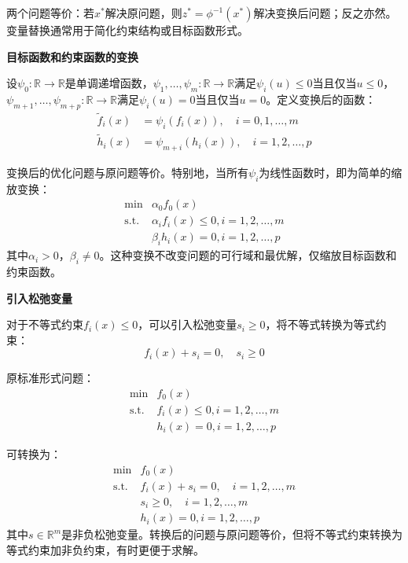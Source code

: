 \documentclass[12pt,a4paper]{book}
\begin{document}
两个问题等价：若$x^*$解决原问题，则$z^* = \phi^{-1}(x^*)$解决变换后问题；反之亦然。变量替换通常用于简化约束结构或目标函数形式。

\textbf{目标函数和约束函数的变换}

设$\psi_0: \mathbb{R} \to \mathbb{R}$是单调递增函数，$\psi_1,\dots,\psi_m: \mathbb{R} \to \mathbb{R}$满足$\psi_i(u) \leq 0$当且仅当$u \leq 0$，$\psi_{m+1},\dots,\psi_{m+p}: \mathbb{R} \to \mathbb{R}$满足$\psi_i(u) = 0$当且仅当$u = 0$。定义变换后的函数：
\begin{align*}
    \tilde{f}_i(x) &= \psi_i(f_i(x)), \quad i = 0,1,\dots,m \\
    \tilde{h}_i(x) &= \psi_{m+i}(h_i(x)), \quad i = 1,2,\dots,p
\end{align*}

变换后的优化问题与原问题等价。特别地，当所有$\psi_i$为线性函数时，即为简单的缩放变换：
\begin{equation}
    \begin{aligned}
        \min & \alpha_0 f_0(x) \\
        \text{s.t.} & \alpha_i f_i(x) \leq 0 ,i = 1,2,\dots,m\\
        & \beta_i h_i(x) = 0, i = 1,2,\dots,p
    \end{aligned}
\end{equation}
其中$\alpha_i > 0$，$\beta_i \neq 0$。这种变换不改变问题的可行域和最优解，仅缩放目标函数和约束函数。

\textbf{引入松弛变量}

对于不等式约束$f_i(x) \leq 0$，可以引入松弛变量$s_i \geq 0$，将不等式转换为等式约束：
\begin{equation}
    f_i(x) + s_i = 0, \quad s_i \geq 0
\end{equation}

原标准形式问题：
\begin{equation}
    \begin{aligned}
        \min & f_0(x) \\
        \text{s.t.} & f_i(x) \leq 0 ,i = 1,2,\dots,m\\
        & h_i(x) = 0, i = 1,2,\dots,p
    \end{aligned}
\end{equation}

可转换为：
\begin{equation}
    \begin{aligned}
        \min & f_0(x) \\
        \text{s.t.} & f_i(x) + s_i = 0, \quad i = 1,2,\dots,m\\
        & s_i \geq 0, \quad i = 1,2,\dots,m\\
        & h_i(x) = 0, i = 1,2,\dots,p
    \end{aligned}
\end{equation}
其中$s \in \mathbb{R}^m$是非负松弛变量。转换后的问题与原问题等价，但将不等式约束转换为等式约束加非负约束，有时更便于求解。
\end{document}
